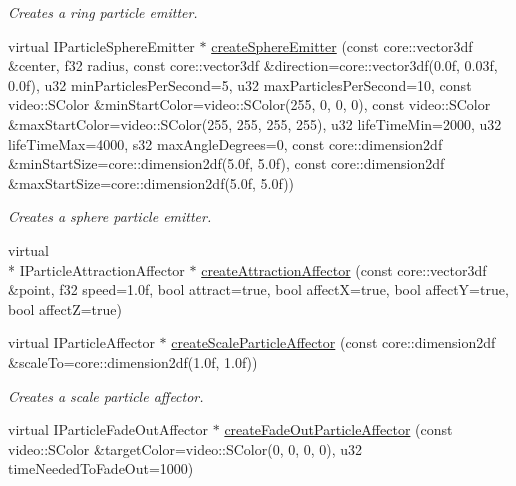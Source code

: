 \begin{DoxyCompactItemize}
\begin{DoxyCompactList}\small\item\em Creates a ring particle emitter. \end{DoxyCompactList}\item 
\hypertarget{classirr_1_1scene_1_1_c_particle_system_scene_node_aafc5ebfc9d2ca95956a0314defa8ae6a}{virtual I\-Particle\-Sphere\-Emitter $\ast$ \hyperlink{classirr_1_1scene_1_1_c_particle_system_scene_node_aafc5ebfc9d2ca95956a0314defa8ae6a}{create\-Sphere\-Emitter} (const core\-::vector3df \&center, f32 radius, const core\-::vector3df \&direction=core\-::vector3df(0.\-0f, 0.\-03f, 0.\-0f), u32 min\-Particles\-Per\-Second=5, u32 max\-Particles\-Per\-Second=10, const video\-::\-S\-Color \&min\-Start\-Color=video\-::\-S\-Color(255, 0, 0, 0), const video\-::\-S\-Color \&max\-Start\-Color=video\-::\-S\-Color(255, 255, 255, 255), u32 life\-Time\-Min=2000, u32 life\-Time\-Max=4000, s32 max\-Angle\-Degrees=0, const core\-::dimension2df \&min\-Start\-Size=core\-::dimension2df(5.\-0f, 5.\-0f), const core\-::dimension2df \&max\-Start\-Size=core\-::dimension2df(5.\-0f, 5.\-0f))}\label{classirr_1_1scene_1_1_c_particle_system_scene_node_aafc5ebfc9d2ca95956a0314defa8ae6a}

\begin{DoxyCompactList}\small\item\em Creates a sphere particle emitter. \end{DoxyCompactList}\item 
virtual \\*
I\-Particle\-Attraction\-Affector $\ast$ \hyperlink{classirr_1_1scene_1_1_c_particle_system_scene_node_a20794c85f695e017c76f248d2b4f2ed3}{create\-Attraction\-Affector} (const core\-::vector3df \&point, f32 speed=1.\-0f, bool attract=true, bool affect\-X=true, bool affect\-Y=true, bool affect\-Z=true)
\item 
\hypertarget{classirr_1_1scene_1_1_c_particle_system_scene_node_a6c5b3fbcf69adefd9610c307620d3006}{virtual I\-Particle\-Affector $\ast$ \hyperlink{classirr_1_1scene_1_1_c_particle_system_scene_node_a6c5b3fbcf69adefd9610c307620d3006}{create\-Scale\-Particle\-Affector} (const core\-::dimension2df \&scale\-To=core\-::dimension2df(1.\-0f, 1.\-0f))}\label{classirr_1_1scene_1_1_c_particle_system_scene_node_a6c5b3fbcf69adefd9610c307620d3006}

\begin{DoxyCompactList}\small\item\em Creates a scale particle affector. \end{DoxyCompactList}\item 
\hypertarget{classirr_1_1scene_1_1_c_particle_system_scene_node_aa10f46a1d3da0798bbf754e84034a76d}{virtual I\-Particle\-Fade\-Out\-Affector $\ast$ \hyperlink{classirr_1_1scene_1_1_c_particle_system_scene_node_aa10f46a1d3da0798bbf754e84034a76d}{create\-Fade\-Out\-Particle\-Affector} (const video\-::\-S\-Color \&target\-Color=video\-::\-S\-Color(0, 0, 0, 0), u32 time\-Needed\-To\-Fade\-Out=1000)}\label{classirr_1_1scene_1_1_c_particle_system_scene_node_aa10f46a1d3da0798bbf754e84034a76d}


\end{DoxyCompactItemize}
